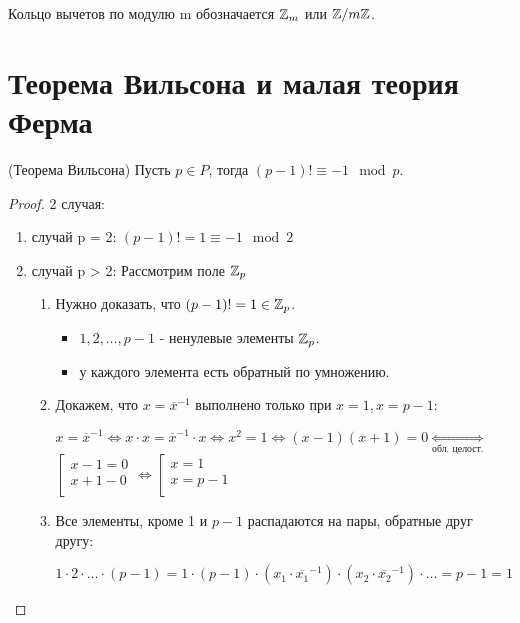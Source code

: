 \begin{notation}
  Кольцо вычетов по модулю m обозначается $\mathbb{Z}_m$ или $\mathbb{Z} /m\mathbb{Z}$.
\end{notation}

\chapter*{Теорема Вильсона и малая теория Ферма}

\begin{theorem} (Теорема Вильсона)
  Пусть $p \in P$, тогда $(p - 1)! \equiv -1 \mod p$.
\end{theorem}

\begin{proof}
  2 случая:
  \begin{enumerate}
    \item случай p = 2: $(p - 1)! = 1 \equiv -1 \mod 2$
    \item случай p > 2: Рассмотрим поле $\mathbb{Z}_p$
    
    \begin{enumerate}

      \item Нужно доказать, что $(p - 1)! = 1 \in \mathbb{Z}_p$.
      \begin{itemize}
        \item $1, 2, \ldots, p - 1$ - ненулевые элементы $\mathbb{Z}_p$.
        \item у каждого элемента есть обратный по умножению.
      \end{itemize}
      \item Докажем, что $x = \overline{x}^{-1}$ выполнено только при $x = 1, x = p - 1$:
      
      $x = \overline{x}^{-1} \Leftrightarrow x \cdot x = \overline{x}^{-1} \cdot x \Leftrightarrow x^2 = 1 \Leftrightarrow (x - 1)(x + 1) = 0 \underset{\text{обл. целост.}}{\Leftrightarrow} $
      $\left[ 
        \begin{gathered} 
          x - 1 = 0 \\ 
          x + 1 - 0 \\ 
        \end{gathered} 
      \right. \Leftrightarrow \left[ 
        \begin{gathered} 
        x = 1\\ 
        x = p - 1 \\ 
        \end{gathered} 
      \right.$
      \item Все элементы, кроме 1 и $p - 1$ распадаются на пары, обратные друг другу:
      
      $1 \cdot 2 \cdot \ldots \cdot (p - 1) = 1 \cdot (p - 1) \cdot (x_1 \cdot \overline{x_1}^{-1}) \cdot (x_2 \cdot \overline{x_2}^{-1}) \cdot \ldots = p - 1 = 1$
    \end{enumerate}
  \end{enumerate}
\end{proof}

